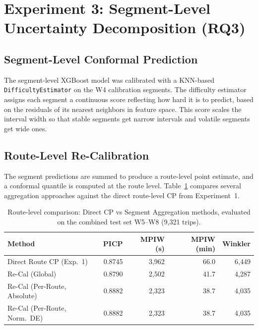 \documentclass[12pt, a4paper, oneside]{report}
\begin{document}
\section{Experiment 3: Segment-Level Uncertainty Decomposition (RQ3)}
\label{sec:exp3_results}


\subsection{Segment-Level Conformal Prediction}

The segment-level XGBoost model was calibrated with a KNN-based \texttt{DifficultyEstimator} on the W4 calibration segments. The difficulty estimator assigns each segment a continuous score reflecting how hard it is to predict, based on the residuals of its nearest neighbors in feature space. This score scales the interval width so that stable segments get narrow intervals and volatile segments get wide ones.

\subsection{Route-Level Re-Calibration}

The segment predictions are summed to produce a route-level point estimate, and a conformal quantile is computed at the route level. Table~\ref{tab:exp3_route_recal} compares several aggregation approaches against the direct route-level CP from Experiment~1.

\begin{table}[H]
\centering
\caption{Route-level comparison: Direct CP vs Segment Aggregation methods, evaluated on the combined test set W5--W8 (9,321 trips).}
\label{tab:exp3_route_recal}
\begin{tabular}{lrrrr}
\toprule
\textbf{Method} & \textbf{PICP} & \textbf{MPIW (s)} & \textbf{MPIW (min)} & \textbf{Winkler} \\
\midrule
Direct Route CP (Exp.~1) & 0.8745 & 3,962 & 66.0 & 6,449 \\
Re-Cal (Global) & 0.8790 & 2,502 & 41.7 & 4,287 \\
Re-Cal (Per-Route, Absolute) & 0.8882 & 2,323 & 38.7 & 4,035 \\
Re-Cal (Per-Route, Norm.\ DE) & 0.8882 & 2,323 & 38.7 & 4,035 \\
\bottomrule
\end{tabular}
\end{table}
\end{document}

